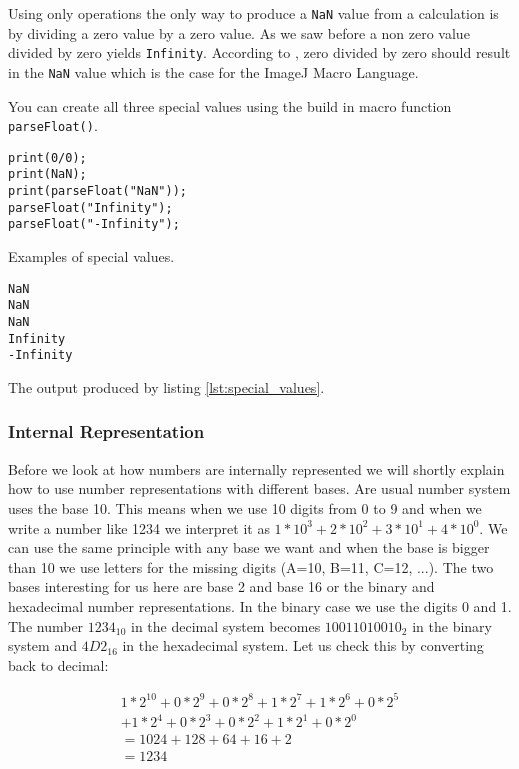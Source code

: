 Using only operations the only way to produce a {\tt NaN} value from a calculation is by dividing a zero value  by a zero value. As we saw before a non zero value divided by zero yields {\tt Infinity}.  According to \cite{_754-2008_2008}, zero divided by zero should result in the {\tt NaN} value which is the case for the ImageJ Macro Language.

You can create all three special values using the build in macro function {\tt parseFloat()}.

\begin{listing}[H]
\begin{verbatim}
print(0/0);
print(NaN);
print(parseFloat("NaN"));
parseFloat("Infinity");
parseFloat("-Infinity");
\end{verbatim}
\caption{Examples of special values.}
\label{lst:special_values}
\end{listing}

\begin{listing}[H]
\begin{verbatim}
NaN
NaN
NaN
Infinity
-Infinity
\end{verbatim}
\caption{The output produced by listing \ref{lst:special_values}.}
\label{lst:special_values_results}
\end{listing}

\subsubsection{Internal Representation}

Before we look at how numbers are internally represented we will shortly explain how to use number representations with different bases. Are usual number system uses the base 10. This means when we use 10 digits from 0 to 9 and when we write a number like 1234 we interpret it as $1*10^{3} + 2*10^{2} + 3*10^{1} + 4*10^{0}$. We can use the same principle with any base we want and when the base is bigger than 10 we use letters for the missing digits (A=10, B=11, C=12, ...). The two bases interesting for us here are base 2 and base 16 or the binary and hexadecimal number representations. In the binary case we use the digits 0 and 1. The number $1234_{10}$ in the decimal system becomes $10011010010_{2}$ in the binary system and $4D2_{16}$ in the hexadecimal system.  Let us check this by converting back to decimal:

\begin{equation}
\begin{split}
 1 * 2^{10} + 0 * 2^{9} + 0 * 2^{8} + 1 * 2^{7} + 1 * 2^{6} + 0 * 2^{5} \\
 + 1 * 2^{4} + 0 * 2^{3} + 0 * 2^{2} + 1 * 2^{1} + 0 * 2^{0} \\ 
 = 1024 + 128 + 64 + 16 + 2 \\ 
 = 1234
\end{split}
\end{equation}


